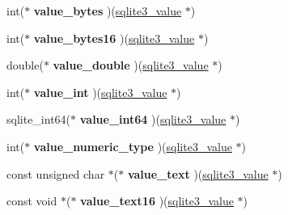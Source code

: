 \begin{DoxyCompactItemize}
\item 
\hypertarget{structsqlite3__api__routines_a36456594eab68bf7907db9582a53ea0a}{int($\ast$ {\bfseries value\-\_\-bytes} )(\hyperlink{struct_mem}{sqlite3\-\_\-value} $\ast$)}\label{structsqlite3__api__routines_a36456594eab68bf7907db9582a53ea0a}

\item 
\hypertarget{structsqlite3__api__routines_a5bbfaab79c286e78fe420d96d65d7167}{int($\ast$ {\bfseries value\-\_\-bytes16} )(\hyperlink{struct_mem}{sqlite3\-\_\-value} $\ast$)}\label{structsqlite3__api__routines_a5bbfaab79c286e78fe420d96d65d7167}

\item 
\hypertarget{structsqlite3__api__routines_aa023ab267b40e50bec5ccacd32486eb8}{double($\ast$ {\bfseries value\-\_\-double} )(\hyperlink{struct_mem}{sqlite3\-\_\-value} $\ast$)}\label{structsqlite3__api__routines_aa023ab267b40e50bec5ccacd32486eb8}

\item 
\hypertarget{structsqlite3__api__routines_a31b7443c4d35480567266930a3d4e64f}{int($\ast$ {\bfseries value\-\_\-int} )(\hyperlink{struct_mem}{sqlite3\-\_\-value} $\ast$)}\label{structsqlite3__api__routines_a31b7443c4d35480567266930a3d4e64f}

\item 
\hypertarget{structsqlite3__api__routines_ae2eb08ff1ad717cf6737d657fd8a11b5}{sqlite\-\_\-int64($\ast$ {\bfseries value\-\_\-int64} )(\hyperlink{struct_mem}{sqlite3\-\_\-value} $\ast$)}\label{structsqlite3__api__routines_ae2eb08ff1ad717cf6737d657fd8a11b5}

\item 
\hypertarget{structsqlite3__api__routines_a9032977e99c01fc28d3c3f054192f7cd}{int($\ast$ {\bfseries value\-\_\-numeric\-\_\-type} )(\hyperlink{struct_mem}{sqlite3\-\_\-value} $\ast$)}\label{structsqlite3__api__routines_a9032977e99c01fc28d3c3f054192f7cd}

\item 
\hypertarget{structsqlite3__api__routines_abb9daaa43ca3ddb2c9bad4991f9a327c}{const unsigned char $\ast$($\ast$ {\bfseries value\-\_\-text} )(\hyperlink{struct_mem}{sqlite3\-\_\-value} $\ast$)}\label{structsqlite3__api__routines_abb9daaa43ca3ddb2c9bad4991f9a327c}

\item 
\hypertarget{structsqlite3__api__routines_a2a4f433b82df50bbb9178b33f851237a}{const void $\ast$($\ast$ {\bfseries value\-\_\-text16} )(\hyperlink{struct_mem}{sqlite3\-\_\-value} $\ast$)}\label{structsqlite3__api__routines_a2a4f433b82df50bbb9178b33f851237a}


\end{DoxyCompactItemize}
